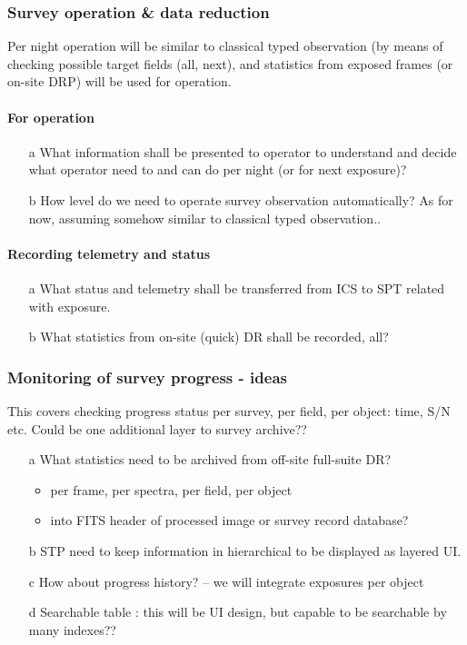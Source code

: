 \documentclass[a4paper,notitlepage]{article}
\begin{document}
\subsubsection{Survey operation \& data reduction}

Per night operation will be similar to classical typed observation (by
means of checking possible target fields (all, next), and statistics
from exposed frames (or on-site DRP) will be used for operation.

\paragraph{For operation}

\begin{enumerate}
  \item[a] What information shall be presented to operator to understand and 
    decide what operator need to and can do per night (or for next exposure)?
  \item[b] How level do we need to operate survey observation automatically?
    As for now, assuming somehow similar to classical typed observation..
\end{enumerate}

\paragraph{Recording telemetry and status}

\begin{enumerate}
  \item[a] What status and telemetry shall be transferred from ICS to SPT 
    related with exposure.
  \item[b] What statistics from on-site (quick) DR shall be recorded, all?
\end{enumerate}

\subsubsection{Monitoring of survey progress - ideas}

This covers checking progress status per survey, per field, per object: 
time, S/N etc. Could be one additional layer to survey archive??

\begin{enumerate}
  \item[a] What statistics need to be archived from off-site full-suite DR?
    \begin{itemize}
      \item per frame, per spectra, per field, per object
      \item into FITS header of processed image or survey record database?
    \end{itemize}
  \item[b] STP need to keep information in hierarchical to be displayed as layered UI.
  \item[c] How about progress history? -- we will integrate exposures per object
  \item[d] Searchable table : this will be UI design, but capable to be searchable 
    by many indexes??
\end{enumerate}
\end{document}
